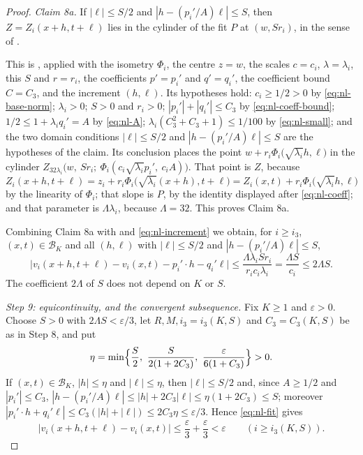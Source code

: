 \begin{proof}
\emph{Claim 8a.} If $|\ell|\le S/2$ and $|h-(p_i'/A)\ell|\le S$, then
$Z=Z_i(x+h,t+\ell)$ lies in the cylinder of the fit $P$ at $(w,Sr_i)$, in the
sense of .

This is , applied with the isometry $\Phi_i$, the
centre $z=w$, the scales $c=c_i$, $\lambda=\lambda_i$, this $S$ and $r=r_i$, the
coefficients $p'=p_i'$ and $q'=q_i'$, the coefficient bound $C=C_3$, and the
increment $(h,\ell)$. Its hypotheses hold: $c_i\ge1/2>0$ by
\eqref{eq:nl-base-norm}; $\lambda_i>0$; $S>0$ and $r_i>0$;
$|p_i'|+|q_i'|\le C_3$ by \eqref{eq:nl-coeff-bound};
$1/2\le1+\lambda_iq_i'=A$ by \eqref{eq:nl-A};
$\lambda_i(C_3^2+C_3+1)\le1/100$ by \eqref{eq:nl-small}; and the two domain
conditions $|\ell|\le S/2$ and $|h-(p_i'/A)\ell|\le S$ are the hypotheses of the
claim. Its conclusion places the point
$w+r_i\Phi_i\bigl(\sqrt{\lambda_i}h,\ell\bigr)$ in the cylinder
$Z_{32\lambda_i}\bigl(w,\ Sr_i;\ \Phi_i(c_i\sqrt{\lambda_i}p_i',\ c_iA)\bigr)$.
That point is $Z$, because
\[
  Z_i(x+h,t+\ell)=z_i+r_i\Phi_i\bigl(\sqrt{\lambda_i}(x+h),t+\ell\bigr)
   =Z_i(x,t)+r_i\Phi_i\bigl(\sqrt{\lambda_i}h,\ell\bigr)
\]
by the linearity of $\Phi_i$; that slope is $P$, by the identity displayed after
\eqref{eq:nl-coeff}; and that parameter is $\Lambda\lambda_i$, because
$\Lambda=32$. This proves Claim 8a.

Combining Claim 8a with  and
\eqref{eq:nl-increment} we obtain, for $i\ge i_3$, $(x,t)\in\mathcal B_K$ and
all $(h,\ell)$ with $|\ell|\le S/2$ and $|h-(p_i'/A)\ell|\le S$,
\begin{equation}\label{eq:nl-fit}
  \bigl|v_i(x+h,t+\ell)-v_i(x,t)-p_i'\cdot h-q_i'\ell\bigr|
     \le\frac{\Lambda\lambda_iSr_i}{r_ic_i\lambda_i}=\frac{\Lambda S}{c_i}
     \le2\Lambda S .
\end{equation}
The coefficient $2\Lambda$ of $S$ does not depend on $K$ or $S$.

\emph{Step 9: equicontinuity, and the convergent subsequence.}
Fix $K\ge1$ and $\varepsilon>0$. Choose $S>0$ with $2\Lambda S<\varepsilon/3$,
let $R,M,i_3=i_3(K,S)$ and $C_3=C_3(K,S)$ be as in Step 8, and put
\[
  \eta=\min\Bigl\{\frac S2,\ \frac S{2(1+2C_3)},\
                   \frac{\varepsilon}{6(1+C_3)}\Bigr\}>0 .
\]
If $(x,t)\in\mathcal B_K$, $|h|\le\eta$ and $|\ell|\le\eta$, then
$|\ell|\le S/2$ and, since $A\ge1/2$ and $|p_i'|\le C_3$,
$|h-(p_i'/A)\ell|\le|h|+2C_3|\ell|\le\eta(1+2C_3)\le S$; moreover
$|p_i'\cdot h+q_i'\ell|\le C_3(|h|+|\ell|)\le2C_3\eta\le\varepsilon/3$. Hence
\eqref{eq:nl-fit} gives
\begin{equation}\label{eq:nl-equicont}
  \bigl|v_i(x+h,t+\ell)-v_i(x,t)\bigr|
    \le\frac\varepsilon3+\frac\varepsilon3<\varepsilon
    \qquad(i\ge i_3(K,S)).
\end{equation}


\end{proof}

